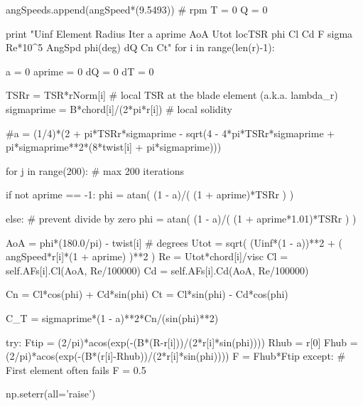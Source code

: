 \begin{pythoncode}
            angSpeeds.append(angSpeed*(9.5493)) # rpm
            T = 0
            Q = 0

            print "Uinf    Element Radius  Iter    a       aprime  AoA     Utot    locTSR  phi     Cl      Cd      F       sigma   Re*10^5 AngSpd  phi(deg)  dQ    Cn      Ct"
            for i in range(len(r)-1): 

                a = 0
                aprime = 0
                dQ = 0
                dT = 0
                
                TSRr = TSR*rNorm[i] # local TSR at the blade element (a.k.a. lambda_r)
                sigmaprime = B*chord[i]/(2*pi*r[i]) # local solidity


                #a = (1/4)*(2 + pi*TSRr*sigmaprime - sqrt(4 - 4*pi*TSRr*sigmaprime + pi*sigmaprime**2*(8*twist[i] + pi*sigmaprime)))


                for j in range(200): # max 200 iterations
                
                    if not aprime == -1:
                        phi = atan( (1 - a)/( (1 + aprime)*TSRr ) )
               
                    else: # prevent divide by zero
                        phi = atan( (1 - a)/( (1 + aprime*1.01)*TSRr ) )

                    AoA = phi*(180.0/pi) - twist[i] # degrees
                    Utot = sqrt(  (Uinf*(1 - a))**2 + ( angSpeed*r[i]*(1 + aprime) )**2  )
                    Re = Utot*chord[i]/visc
                    Cl = self.AFs[i].Cl(AoA, Re/100000)
                    Cd = self.AFs[i].Cd(AoA, Re/100000)


                    Cn = Cl*cos(phi) + Cd*sin(phi)
                    Ct = Cl*sin(phi) - Cd*cos(phi)

                    
                    C_T = sigmaprime*(1 - a)**2*Cn/(sin(phi)**2)

                    try:
                        Ftip = (2/pi)*acos(exp(-(B*(R-r[i]))/(2*r[i]*sin(phi))))
                        Rhub = r[0]
                        Fhub = (2/pi)*acos(exp(-(B*(r[i]-Rhub))/(2*r[i]*sin(phi))))
                        F = Fhub*Ftip
                    except: # First element often fails
                        F = 0.5
                    
                    np.seterr(all='raise') 
                    

\end{pythoncode}
